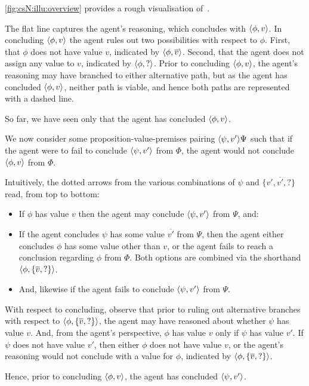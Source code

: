 \begin{note}[Figure]
  \autoref{fig:csN:illu:overview} provides a rough visualisation of~\qzS{}.

  The flat line captures the agent's reasoning, which concludes with \(\langle \phi, v \rangle\).
  In concluding \(\langle \phi, v \rangle\) the agent rules out two possibilities with respect to \(\phi\).
  First, that \(\phi\) does not have value \(v\), indicated by \(\langle \phi, \overline{v} \rangle\).
  Second, that the agent does not assign any value to \(v\), indicated by \(\langle \phi, ? \rangle\).
  Prior to concluding \(\langle \phi, v \rangle\), the agent's reasoning may have branched to either alternative path, but as the agent has concluded \(\langle \phi, v \rangle\), neither path is viable, and hence both paths are represented with a dashed line.

  So far, we have seen only that the agent has concluded \(\langle \phi, v \rangle\).

  We now consider some proposition-value-premises pairing \(\langle \psi, v' \rangle{\Psi}\) such that if the agent were to fail to conclude \(\langle \psi, v' \rangle\) from \(\Phi\), the agent would not conclude \(\langle \phi, v \rangle\) from \(\Phi\).

  Intuitively, the dotted arrows from the various combinations of \(\psi\) and \(\{v',\overline{v'},?\}\) read, from top to bottom:
  \begin{itemize}
  \item If \(\phi\) has value \(v\) then the agent may conclude \(\langle \psi, v' \rangle\) from \(\Psi\), and:
  \item If the agent concludes \(\psi\) has some value \(\overline{v'}\) from \(\Psi\), then the agent either concludes \(\phi\) has some value other than \(v\), or the agent fails to reach a conclusion regarding \(\phi\) from \(\Phi\).
    Both options are combined via the shorthand \(\langle \phi, \{\overline{v},?\} \rangle\).
  \item
    And, likewise if the agent fails to conclude \(\langle \psi, v' \rangle\) from \(\Psi\).
  \end{itemize}

  With respect to concluding, observe that prior to ruling out alternative branches with respect to \(\langle \phi, \{\overline{v},?\} \rangle\), the agent may have reasoned about whether \(\psi\) has value \(v\).
  And, from the agent's perspective, \(\phi\) has value \(v\) only if \(\psi\) has value \(v'\).
  If \(\psi\) does not have value \(v'\), then either \(\phi\) does not have value \(v\), or the agent's reasoning would not conclude with a value for \(\phi\), indicated by \(\langle \phi, \{\overline{v},?\} \rangle\).

  Hence, prior to concluding \(\langle \phi, v \rangle\), the agent has concluded \(\langle \psi, v' \rangle\).
\end{note}

